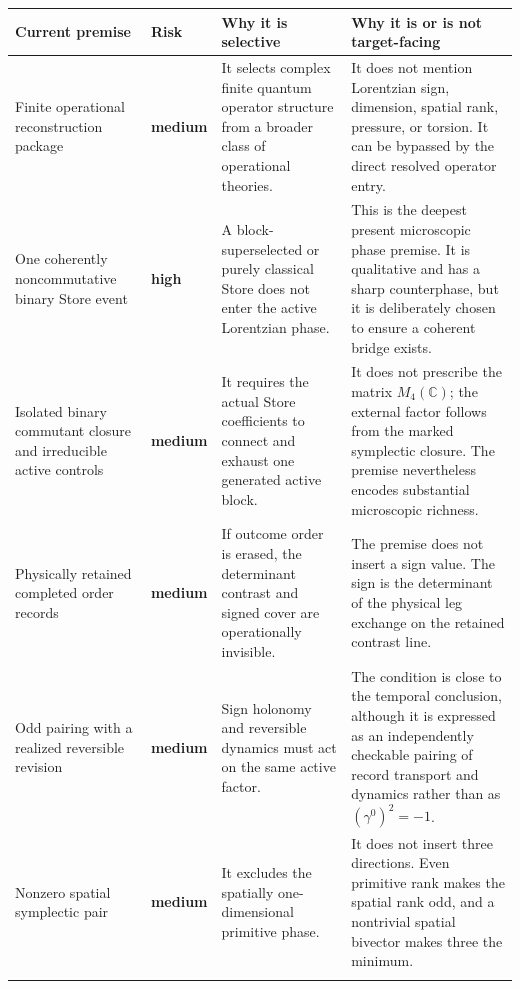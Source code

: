 \documentclass[11pt]{article}
\theoremstyle{definition}
\theoremstyle{remark}
\newcommand{\C}{\mathbb C}
\newcommand{\mediumrisk}{\textcolor{deepblue}{\textbf{medium}}}
\newcommand{\highrisk}{\textcolor{deepred}{\textbf{high}}}
\begin{document}
\begingroup
\small
\setlength{\tabcolsep}{4pt}
\begin{longtable}{L{0.25\textwidth}L{0.13\textwidth}L{0.26\textwidth}L{0.28\textwidth}}
\toprule
\textbf{Current premise} & \textbf{Risk} & \textbf{Why it is selective} & \textbf{Why it is or is not target-facing} \\
\midrule
\endhead

Finite operational reconstruction package
& \mediumrisk
& It selects complex finite quantum operator structure from a broader class of operational theories.
& It does not mention Lorentzian sign, dimension, spatial rank, pressure, or torsion.  It can be bypassed by the direct resolved operator entry. \\
\addlinespace

One coherently noncommutative binary Store event
& \highrisk
& A block-superselected or purely classical Store does not enter the active Lorentzian phase.
& This is the deepest present microscopic phase premise.  It is qualitative and has a sharp counterphase, but it is deliberately chosen to ensure a coherent bridge exists. \\
\addlinespace

Isolated binary commutant closure and irreducible active controls
& \mediumrisk
& It requires the actual Store coefficients to connect and exhaust one generated active block.
& It does not prescribe the matrix $M_4(\C)$; the external factor follows from the marked symplectic closure.  The premise nevertheless encodes substantial microscopic richness. \\
\addlinespace

Physically retained completed order records
& \mediumrisk
& If outcome order is erased, the determinant contrast and signed cover are operationally invisible.
& The premise does not insert a sign value.  The sign is the determinant of the physical leg exchange on the retained contrast line. \\
\addlinespace

Odd pairing with a realized reversible revision
& \mediumrisk
& Sign holonomy and reversible dynamics must act on the same active factor.
& The condition is close to the temporal conclusion, although it is expressed as an independently checkable pairing of record transport and dynamics rather than as $(\gamma^0)^2=-1$. \\
\addlinespace

Nonzero spatial symplectic pair
& \mediumrisk
& It excludes the spatially one-dimensional primitive phase.
& It does not insert three directions.  Even primitive rank makes the spatial rank odd, and a nontrivial spatial bivector makes three the minimum. \\
\addlinespace


\end{longtable}
\end{document}
